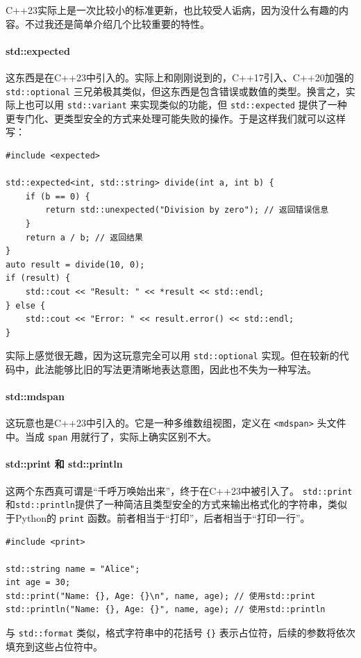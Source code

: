 C++23实际上是一次比较小的标准更新，也比较受人诟病，因为没什么有趣的内容。不过我还是简单介绍几个比较重要的特性。

\paragraph{std::expected}

这东西是在C++23中引入的。实际上和刚刚说到的，C++17引入、C++20加强的 \verb|std::optional| 三兄弟极其类似，但这东西是包含错误或数值的类型。换言之，实际上也可以用 \verb|std::variant| 来实现类似的功能，但 \verb|std::expected| 提供了一种更专门化、更类型安全的方式来处理可能失败的操作。于是这样我们就可以这样写：
\begin{verbatim}
#include <expected>

std::expected<int, std::string> divide(int a, int b) {
    if (b == 0) {
        return std::unexpected("Division by zero"); // 返回错误信息
    }
    return a / b; // 返回结果
}
auto result = divide(10, 0);
if (result) {
    std::cout << "Result: " << *result << std::endl;
} else {
    std::cout << "Error: " << result.error() << std::endl;
}
\end{verbatim}
实际上感觉很无趣，因为这玩意完全可以用 \verb|std::optional| 实现。但在较新的代码中，此法能够比旧的写法更清晰地表达意图，因此也不失为一种写法。

\paragraph{std::mdspan}

这玩意也是C++23中引入的。它是一种多维数组视图，定义在 \verb|<mdspan>| 头文件中。当成 \verb|span| 用就行了，实际上确实区别不大。

\paragraph{std::print 和 std::println}

这两个东西真可谓是“千呼万唤始出来”，终于在C++23中被引入了。 \verb|std::print| 和\verb|std::println|提供了一种简洁且类型安全的方式来输出格式化的字符串，类似于Python的 \verb|print| 函数。前者相当于“打印”，后者相当于“打印一行”。
\begin{verbatim}
#include <print>

std::string name = "Alice";
int age = 30;
std::print("Name: {}, Age: {}\n", name, age); // 使用std::print
std::println("Name: {}, Age: {}", name, age); // 使用std::println
\end{verbatim}
与 \verb|std::format| 类似，格式字符串中的花括号 \verb|{}| 表示占位符，后续的参数将依次填充到这些占位符中。

